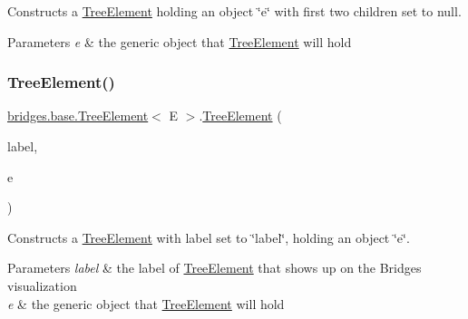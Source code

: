 Constructs a \mbox{\hyperlink{classbridges_1_1base_1_1_tree_element}{Tree\+Element}} holding an object \char`\"{}e\char`\"{} with first two children set to null.


\begin{DoxyParams}{Parameters}
{\em e} & the generic object that \mbox{\hyperlink{classbridges_1_1base_1_1_tree_element}{Tree\+Element}} will hold \\
\hline
\end{DoxyParams}
\mbox{\label{classbridges_1_1base_1_1_tree_element_a476cbeedf2c56f6a40a632035b7d740e}} 
\subsubsection{\texorpdfstring{TreeElement()}{TreeElement()}\hspace{0.1cm}{\footnotesize\ttfamily [3/5]}}
{\footnotesize\ttfamily \mbox{\hyperlink{classbridges_1_1base_1_1_tree_element}{bridges.\+base.\+Tree\+Element}}$<$ E $>$.\mbox{\hyperlink{classbridges_1_1base_1_1_tree_element}{Tree\+Element}} (\begin{DoxyParamCaption}\item[{String}]{label,  }\item[{E}]{e }\end{DoxyParamCaption})}

Constructs a \mbox{\hyperlink{classbridges_1_1base_1_1_tree_element}{Tree\+Element}} with label set to \char`\"{}label\char`\"{}, holding an object \char`\"{}e\char`\"{}. 
\begin{DoxyParams}{Parameters}
{\em label} & the label of \mbox{\hyperlink{classbridges_1_1base_1_1_tree_element}{Tree\+Element}} that shows up on the Bridges visualization \\
\hline
{\em e} & the generic object that \mbox{\hyperlink{classbridges_1_1base_1_1_tree_element}{Tree\+Element}} will hold \\
\hline
\end{DoxyParams}
\mbox{\label{classbridges_1_1base_1_1_tree_element_aae24dfde287dc0596c69ad853f12f72e}} 
